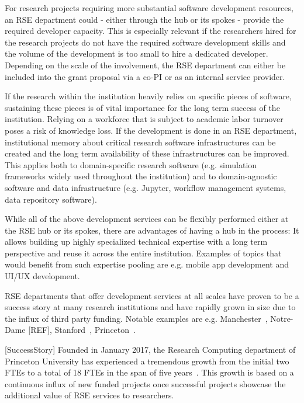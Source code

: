 \documentclass[a4paper]{article}
\makeatletter
\newcommand*{\eg}{e.g.\@\xspace}
\makeatother
\begin{document}
For research projects requiring more substantial software development resources, an RSE department could - either through the hub or its spokes - provide the required developer capacity.
This is especially relevant if the researchers hired for the research projects do not have the required software development skills and the volume of the development is too small to hire a dedicated developer.
Depending on the scale of the involvement, the RSE department can either be included into the grant proposal via a co-PI or as an internal service provider.

If the research within the institution heavily relies on specific pieces of software,
sustaining these pieces is of vital importance for the long term success of the institution.
Relying on a workforce that is subject to academic labor turnover poses a risk of knowledge loss.
If the development is done in an RSE department, institutional memory about critical research software infrastructures can be created and the long term availability of these infrastructures can be improved.
This applies both to domain-specific research software (e.g. simulation frameworks widely used throughout the institution)
and to domain-agnostic software and data infrastructure (\eg Jupyter, workflow management systems, data repository software).

While all of the above development services can be flexibly performed either at the RSE hub or its spokes, there are advantages of having a hub in the process:
It allows building up highly specialized technical expertise with a long term perspective and reuse it across the entire institution.
Examples of topics that would benefit from such expertise pooling are \eg mobile app development and UI/UX development.

RSE departments that offer development services at all scales have proven to be a success story at many research institutions and have rapidly grown in size due to the influx of third party funding.
Notable examples are \eg Manchester~\autocite{Sinclair2022}, Notre-Dame [REF], Stanford~\autocite{Stanford2023}, Princeton~\autocite{Cosden2022a}.

[SuccessStory]
Founded in January 2017, the Research Computing department of Princeton University has experienced a tremendous growth from the initial two FTEs to a total of 18 FTEs in the span of five years~\autocite{Cosden2022a}.
This growth is based on a continuous influx of new funded projects once successful projects showcase the additional value of RSE services to researchers.
\end{document}
